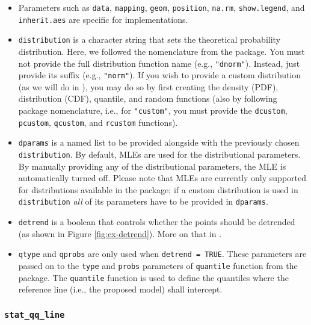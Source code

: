 \begin{itemize}
\item
  Parameters such as \texttt{data}, \texttt{mapping}, \texttt{geom},
  \texttt{position}, \texttt{na.rm}, \texttt{show.legend}, and
  \texttt{inherit.aes} are specific for  implementations.
\item
  \texttt{distribution} is a character string that sets the theoretical
  probability distribution. Here, we followed the nomenclature from the
   package. You must not provide the full distribution
  function name (e.g., \texttt{"dnorm"}). Instead, just provide its
  suffix (e.g., \texttt{"norm"}). If you wish to provide a custom
  distribution (as we will do in ), you may do
  so by first creating the density (PDF), distribution (CDF), quantile,
  and random functions (also by following  package
  nomenclature, i.e., for \texttt{"custom"}, you must provide the
  \texttt{dcustom}, \texttt{pcustom}, \texttt{qcustom}, and
  \texttt{rcustom} functions).
\item
  \texttt{dparams} is a named list to be provided alongside with the
  previously chosen \texttt{distribution}. By default, MLEs are used for
  the distributional parameters. By manually providing any of the
  distributional parameters, the MLE is automatically turned off. Please
  note that MLEs are currently only supported for distributions
  available in the  package; if a custom distribution is used
  in \texttt{distribution} \emph{all} of its parameters have to be
  provided in \texttt{dparams}.
\item
  \texttt{detrend} is a boolean that controls whether the points should
  be detrended (as shown in Figure \ref{fig:ex-detrend}). More on that
  in .
\item
  \texttt{qtype} and \texttt{qprobs} are only used when
  \texttt{detrend\ =\ TRUE}. These parameters are passed on to the
  \texttt{type} and \texttt{probs} parameters of \texttt{quantile}
  function from the  package. The \texttt{quantile} function
  is used to define the quantiles where the reference line (i.e., the
  proposed model) shall intercept.
\end{itemize}

\subsubsection{\texorpdfstring{\texttt{stat\_qq\_line}}{stat\_qq\_line}}\label{stat_qq_line}

